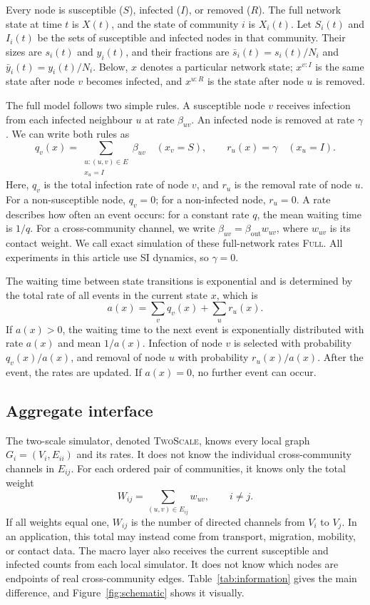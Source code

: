 \documentclass[a4paper,fleqn]{cas-sc}
\newcommand{\ibar}{\bar{y}}
\newcommand{\sbar}{\bar{s}}
\newcommand{\Full}{\textup{\textsc{Full}}}
\newcommand{\TS}{\textup{\textsc{TwoScale}}}
\begin{document}
Every node is susceptible ($S$), infected ($I$), or removed ($R$). The full network state at time $t$ is $X(t)$, and the state of community $i$ is $X_i(t)$. Let $S_i(t)$ and $I_i(t)$ be the sets of susceptible and infected nodes in that community. Their sizes are $s_i(t)$ and $y_i(t)$, and their fractions are $\sbar_i(t)=s_i(t)/N_i$ and $\ibar_i(t)=y_i(t)/N_i$. Below, $x$ denotes a particular network state; $x^{v:I}$ is the same state after node $v$ becomes infected, and $x^{u:R}$ is the state after node $u$ is removed.

The full model follows two simple rules. A susceptible node $v$ receives infection from each infected neighbour $u$ at rate $\beta_{uv}$. An infected node is removed at rate $\gamma$. We can write both rules as
\begin{equation}
\label{eq:full_generator}
q_v(x)=\sum_{\substack{u:(u,v)\in E\\x_u=I}}\beta_{uv}
\quad (x_v=S),
\qquad r_u(x)=\gamma\quad (x_u=I).
\end{equation}
Here, $q_v$ is the total infection rate of node $v$, and $r_u$ is the removal rate of node $u$. For a non-susceptible node, $q_v=0$; for a non-infected node, $r_u=0$. A rate describes how often an event occurs: for a constant rate $q$, the mean waiting time is $1/q$. For a cross-community channel, we write $\beta_{uv}=\beta_{\mathrm{out}}w_{uv}$, where $w_{uv}$ is its contact weight. We call exact simulation of these full-network rates \Full{}. All experiments in this article use SI dynamics, so $\gamma=0$.

The waiting time between state transitions is exponential and is determined by the total rate of all events in the current state $x$, which is
\[
a(x)=\sum_v q_v(x)+\sum_u r_u(x).
\]
If $a(x)>0$, the waiting time to the next event is exponentially distributed with rate $a(x)$ and mean $1/a(x)$. Infection of node $v$ is selected with probability $q_v(x)/a(x)$, and removal of node $u$ with probability $r_u(x)/a(x)$. After the event, the rates are updated. If $a(x)=0$, no further event can occur.

\subsection{Aggregate interface}
\label{sec:interface}

The two-scale simulator, denoted \TS{}, knows every local graph $G_i=(V_i,E_{ii})$ and its rates. It does not know the individual cross-community channels in $E_{ij}$. For each ordered pair of communities, it knows only the total weight
\begin{equation}
\label{eq:weight}
W_{ij}=\sum_{(u,v)\in E_{ij}}w_{uv},
\qquad i\neq j.
\end{equation}
If all weights equal one, $W_{ij}$ is the number of directed channels from $V_i$ to $V_j$. In an application, this total may instead come from transport, migration, mobility, or contact data. The macro layer also receives the current susceptible and infected counts from each local simulator. It does not know which nodes are endpoints of real cross-community edges. Table~\ref{tab:information} gives the main difference, and Figure~\ref{fig:schematic} shows it visually.
\end{document}
